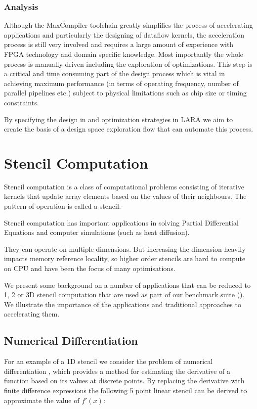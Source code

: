 \subsubsection{Analysis}
Although the MaxCompiler toolchain greatly simplifies the process of
accelerating applications and particularly the designing of dataflow
kernels, the acceleration process is still very involved and requires
a large amount of experience with FPGA technology and domain specific
knowledge. Most importantly the whole process is manually driven
including the exploration of optimizations. This step is a critical
and time consuming part of the design process which is vital in
achieving maximum performance (in terms of operating frequency, number
of parallel pipelines etc.) subject to physical limitations such as
chip size or timing constraints.

By specifying the design in \FAST{} and optimization strategies in LARA
we aim to create the basis of a design space exploration flow that can
automate this process.

\section{Stencil Computation}

Stencil computation is a class of computational problems consisting of
iterative kernels that update array elements based on the values of
their neighbours. The pattern of operation is called a stencil.

Stencil computation has important applications in solving Partial
Differential Equations and computer simulations (such as heat
diffusion).

They can operate on multiple dimensions. But increasing the dimension
heavily impacts memory reference locality, so higher order stencils
are hard to compute on CPU and have been the focus of many
optimisations.

We present some background on a number of applications that can be
reduced to 1, 2 or 3D stencil computation that are used as part of our
benchmark suite (). We illustrate the importance
of the applications and traditional approaches to accelerating them.

\subsection{Numerical Differentiation}

For an example of a 1D stencil we consider the problem of numerical
differentiation \cite{numericaldiff}, which provides a method for
estimating the derivative of a function based on its values at
discrete points. By replacing the derivative with finite difference
expressions the following 5 point linear stencil can be derived to
approximate the value of $f'(x)$:

